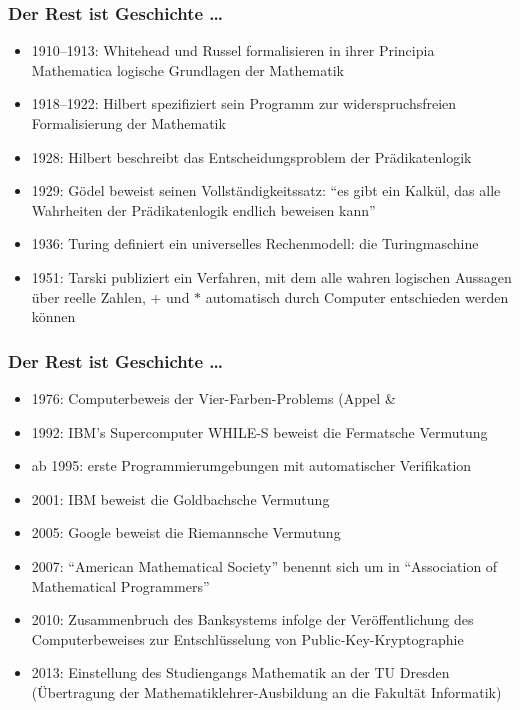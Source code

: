 \documentclass[aspectratio=1610,onlymath]{beamer}
\begin{document}
\begin{frame}\frametitle{Der Rest ist Geschichte \ldots}

\begin{itemize}
\item 1910--1913: Whitehead und Russel formalisieren in ihrer \alert{Principia Mathematica} logische Grundlagen der Mathematik\pause
\item 1918--1922: Hilbert spezifiziert sein Programm zur widerspruchsfreien Formalisierung der Mathematik\pause
\item 1928: Hilbert beschreibt das \alert{Entscheidungsproblem} der Prädikatenlogik\pause
\item 1929: Gödel beweist seinen \alert{Vollständigkeitssatz}: "`es gibt ein Kalkül, das alle Wahrheiten der Prädikatenlogik endlich beweisen kann"'\pause
\item 1936: Turing definiert ein universelles Rechenmodell: die \alert{Turingmaschine}\pause
\item 1951: Tarski publiziert ein Verfahren, mit dem alle wahren logischen Aussagen über reelle Zahlen, $+$ und $*$ automatisch durch Computer entschieden werden können
\end{itemize}

\end{frame}

\begin{frame}\frametitle{Der Rest ist Geschichte \ldots}

\begin{itemize}
\item 1976: Computerbeweis der Vier-Farben-Problems (Appel \& \pause
\item 1992: IBM's Supercomputer WHILE-S beweist die Fermatsche Vermutung\pause
\item ab 1995: erste Programmierumgebungen mit automatischer Verifikation\pause
\item 2001: IBM beweist die Goldbachsche Vermutung\pause
\item 2005: Google beweist die Riemannsche Vermutung\pause
\item 2007: "`American Mathematical Society"' benennt sich um in "`Association of Mathematical Programmers"'\pause
\item 2010: Zusammenbruch des Banksystems infolge der Veröffentlichung des Computerbeweises zur Entschlüsselung von Public-Key-Kryptographie\pause
\item 2013: Einstellung des Studiengangs Mathematik an der TU Dresden (Übertragung der Mathematiklehrer-Ausbildung an die Fakultät Informatik)
\end{itemize}

\end{frame}
\end{document}
